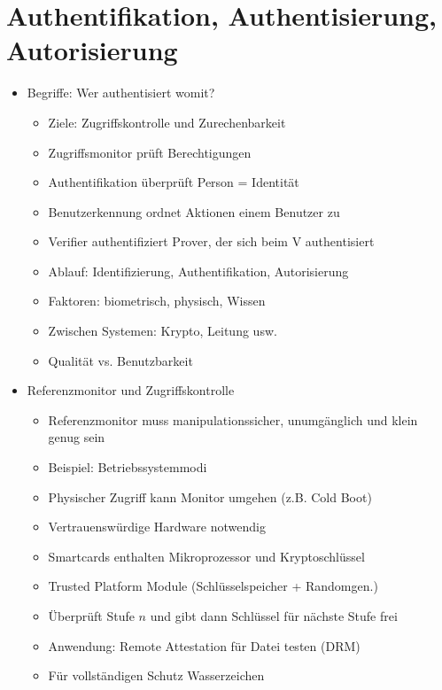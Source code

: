\documentclass[11pt, paper=a4, twocolumn]{scrartcl}
\begin{document}
\section{Authentifikation, Authentisierung, Autorisierung}
	\begin{itemize}
		\item Begriffe: Wer authentisiert womit?
			\begin{itemize}
				\item Ziele: Zugriffskontrolle und Zurechenbarkeit
				\item Zugriffsmonitor prüft Berechtigungen
				\item Authentifikation überprüft Person = Identität
				\item Benutzerkennung ordnet Aktionen einem Benutzer zu
				\item Verifier authentifiziert Prover, der sich beim V 
					authentisiert
				\item Ablauf: Identifizierung, Authentifikation, 
					Autorisierung
				\item Faktoren: biometrisch, physisch, Wissen
				\item Zwischen Systemen: Krypto, Leitung usw.
				\item Qualität vs. Benutzbarkeit
			\end{itemize}

		\item Referenzmonitor und Zugriffskontrolle
			\begin{itemize}
				\item Referenzmonitor muss manipulationssicher, 
					unumgänglich und klein genug sein
				\item Beispiel: Betriebssystemmodi 
				\item Physischer Zugriff kann Monitor umgehen 
					(z.B. Cold Boot)
				\item Vertrauenswürdige Hardware notwendig
				\item Smartcards enthalten Mikroprozessor und 
					Kryptoschlüssel
				\item Trusted Platform Module (Schlüsselspeicher + 
					Randomgen.)
				\item Überprüft Stufe $n$ und gibt dann Schlüssel für 
					nächste Stufe frei
				\item Anwendung: Remote Attestation für Datei testen (DRM)
				\item Für vollständigen Schutz Wasserzeichen
			\end{itemize}


\end{itemize}
\end{document}
